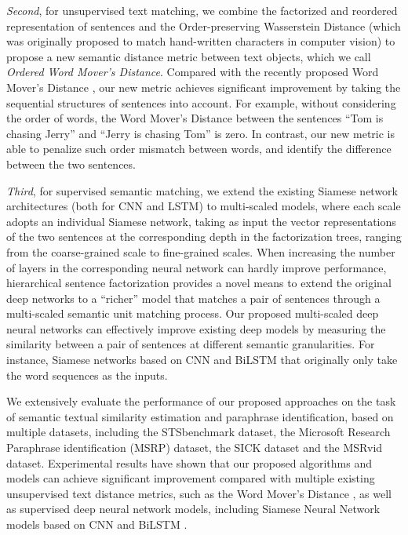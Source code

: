 \textit{Second}, for unsupervised text matching, we combine the factorized and reordered representation of sentences and the Order-preserving Wasserstein Distance \cite{su2017order} (which was originally proposed to match hand-written characters in computer vision) to propose a new semantic distance metric between text objects, which we call \textit{Ordered Word Mover's Distance}. Compared with the recently proposed Word Mover's Distance  \cite{kusner2015word}, our new metric achieves significant improvement by taking the sequential structures of sentences into account. For example, without considering the order of words, the Word Mover's Distance between the sentences
 ``Tom is chasing Jerry'' and ``Jerry is chasing Tom'' is zero. In contrast, our new metric is able to penalize such order mismatch between words, and identify the difference between the two sentences.

\textit{Third}, for supervised semantic matching, we extend the existing Siamese network architectures (both for CNN and LSTM) to multi-scaled models, where each scale adopts an individual Siamese network, taking as input the vector representations of the two sentences at the corresponding depth in the factorization trees, ranging from the coarse-grained scale to fine-grained scales. 
When increasing the number of layers in the corresponding neural network can hardly improve performance, hierarchical sentence factorization provides a novel means to extend the original deep networks to a ``richer'' model that matches a pair of sentences through a multi-scaled semantic unit matching process. 
Our proposed multi-scaled deep neural networks can effectively improve existing deep models by measuring the similarity between a pair of sentences at different semantic granularities. For instance, Siamese networks based on CNN and BiLSTM \cite{mueller2016siamese,shao2017hcti} that originally only take the word sequences as the inputs.

We extensively evaluate the performance of our proposed approaches on the task of semantic textual similarity estimation and paraphrase identification, based on multiple datasets, including the STSbenchmark dataset, the Microsoft Research Paraphrase identification (MSRP) dataset, the SICK dataset and the MSRvid dataset. Experimental results have shown that our proposed algorithms and models can achieve significant improvement compared with multiple existing unsupervised text distance metrics, such as the Word Mover's Distance \cite{kusner2015word}, as well as supervised deep neural network models, including Siamese Neural Network models based on CNN and BiLSTM \cite{mueller2016siamese,shao2017hcti}.

